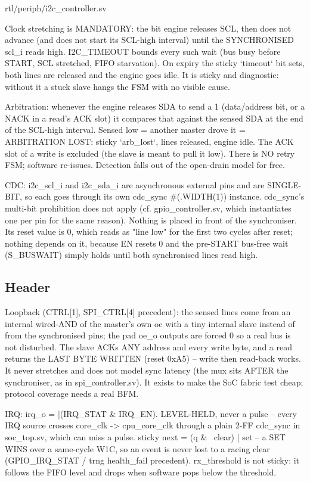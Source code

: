\begin{relocated}{rtl/periph/i2c_controller.sv}
\begin{textblock}
Clock stretching is MANDATORY: the bit engine releases SCL, then does not advance (and does not
start its SCL-high interval) until the SYNCHRONISED scl_i reads high. I2C_TIMEOUT bounds every such
wait (bus busy before START, SCL stretched, FIFO starvation). On expiry the sticky `timeout` bit
sets, both lines are released and the engine goes idle. It is sticky and diagnostic: without it a
stuck slave hangs the FSM with no visible cause.

Arbitration: whenever the engine releases SDA to send a 1 (data/address bit, or a NACK in a read's
ACK slot) it compares that against the sensed SDA at the end of the SCL-high interval. Sensed low
= another master drove it = ARBITRATION LOST: sticky `arb_lost`, lines released, engine idle. The
ACK slot of a write is excluded (the slave is meant to pull it low). There is NO retry FSM;
software re-issues. Detection falls out of the open-drain model for free.

CDC: i2c_scl_i and i2c_sda_i are asynchronous external pins and are SINGLE-BIT, so each goes
through its own cdc_sync #(.WIDTH(1)) instance. cdc_sync's multi-bit prohibition does not
apply (cf. gpio_controller.sv, which instantiates one per pin for the same reason). Nothing is
placed in front of the synchroniser. Its reset value is 0, which reads as "line low" for the first
two cycles after reset; nothing depends on it, because EN resets 0 and the pre-START bus-free wait
(S_BUSWAIT) simply holds until both synchronised lines read high.
\end{textblock}

\subsection*{Header}

\begin{textblock}
Loopback (CTRL[1], SPI_CTRL[4] precedent): the sensed lines come from an internal wired-AND of
the master's own oe with a tiny internal slave instead of from the synchronised pins; the pad
oe_o outputs are forced 0 so a real bus is not disturbed. The slave ACKs ANY address and every
write byte, and a read returns the LAST BYTE WRITTEN (reset 0xA5) -- write then read-back works.
It never stretches and does not model sync latency (the mux sits AFTER the synchroniser, as in
spi_controller.sv). It exists to make the SoC fabric test cheap; protocol coverage needs a real BFM.

IRQ: irq_o = |(IRQ_STAT & IRQ_EN). LEVEL-HELD, never a pulse -- every IRQ source crosses
core_clk -> cpu_core_clk through a plain 2-FF cdc_sync in soc_top.sv, which can miss a pulse.
  sticky next = (q & ~clear) | set    -- a SET WINS over a same-cycle W1C, so an event is never
  lost to a racing clear (GPIO_IRQ_STAT / trng health_fail precedent). rx_threshold is not
  sticky: it follows the FIFO level and drops when software pops below the threshold.


\end{textblock}
\end{relocated}
